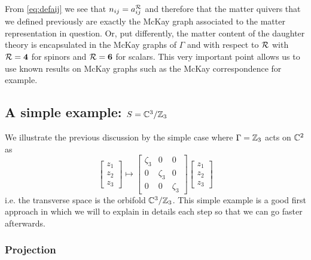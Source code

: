 \documentclass[a4paper,10pt]{article}
\begin{document}
        From \eqref{eq:defaij} we see that $n_{ij}=a^{\mathcal{R}}_{ij}$ and therefore that the matter quivers that we defined previously are exactly the McKay graph associated to the matter representation in question. Or, put differently, the matter content of the daughter theory is encapsulated in the McKay graphs of $\Gamma$ and with respect to $\mathcal{R}$ with $\mathcal{R}=\boldsymbol{4}$ for spinors and $\mathcal{R}=\boldsymbol{6}$ for scalars. This very important point allows us to use known results on McKay graphs such as the McKay correspondence for example.


    \subsection{A simple example: $S=\mathbb{C}^3/\mathbb{Z}_3$}\label{sec:C3Z3}

        We illustrate the previous discussion by the simple case where $\Gamma=\mathbb{Z}_3$ acts on $\mathbb{C}^2$ as
        \begin{equation}
            \begin{bmatrix}
                z_1\\z_2\\z_3
            \end{bmatrix}\mapsto
            \begin{bmatrix}
                \zeta_3 & 0 & 0 \\
                0 & \zeta_3 & 0 \\
                0 & 0 & \zeta_3
            \end{bmatrix}
            \begin{bmatrix}
                z_1\\z_2\\z_3
            \end{bmatrix}
        \end{equation}
        i.e. the transverse space is the orbifold $\mathbb{C}^3/\mathbb{Z}_3$. This simple example is a good first approach in which we will to explain in details each step so that we can go faster afterwards.

        \subsubsection{Projection}
\end{document}

